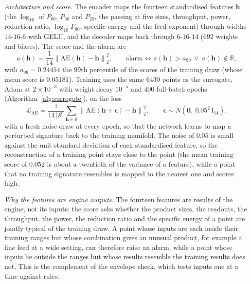 \emph{Architecture and score.} The encoder maps the fourteen standardised features $\mathbf h$ (the $\log_{10}$ of $P_{80}$, $P_{50}$ and $P_{20}$,
the passing at five sizes, throughput, power, reduction ratio, $\log_{10}F_{80}$, specific energy and the feed exponent) through widths $14$-$16$-$6$
with GELU, and the decoder maps back through $6$-$16$-$14$ ($692$ weights and biases). The score and the alarm are
\begin{equation}
a(\mathbf h) = \frac{1}{14}\left\|\mathrm{AE}(\mathbf h) - \mathbf h\right\|_2^2,\qquad
\text{alarm} \iff a(\mathbf h) > a_{99}\ \lor\ a(\mathbf h)\notin\mathbb R,
\label{eq:ae}
\end{equation}
with $a_{99}=0.24454$ the $99$th percentile of the scores of the training draw (whose mean score is $0.05181$). Training uses the same $6430$ points
as the surrogate, Adam at $2\times10^{-3}$ with weight decay $10^{-5}$ and $400$ full-batch epochs (Algorithm~\ref{alg:surrogate}), on the loss
\begin{equation}
\mathcal L_{\mathrm{AE}} = \frac{1}{14\,|\mathcal S|}\sum_{\mathbf h\in\mathcal S}\left\|\mathrm{AE}(\mathbf h+\boldsymbol\epsilon)-\mathbf h\right\|_2^2,
\qquad \boldsymbol\epsilon\sim N\!\left(\mathbf 0,\ 0.05^2\,\mathrm I_{14}\right),
\label{eq:dae}
\end{equation}
with a fresh noise draw at every epoch, so that the network learns to map a perturbed signature back to the training manifold. The noise of
$0.05$ is small against the unit standard deviation of each standardised feature, so the reconstruction of a training point stays close
to the point (the mean training score of $0.052$ is about a twentieth of the variance of a feature), while a point that no training signature
resembles is mapped to the nearest one and scores high.

\emph{Why the features are engine outputs.} The fourteen features are results of the engine, not its inputs: the score asks whether the
product sizes, the readouts, the throughput, the power, the reduction ratio and the specific energy of a point are jointly typical of the
training draw. A point whose inputs are each inside their training ranges but whose combination gives an unusual product, for example a fine
feed at a wide setting, can therefore raise an alarm, while a point whose inputs lie outside the ranges but whose results resemble the training
results does not. This is the complement of the envelope check, which tests inputs one at a time against rules.

